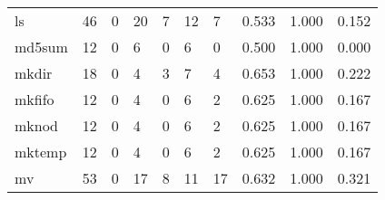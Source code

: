 \begin{longtable}{lp{1.3cm}p{1.3cm}p{1.3cm}p{1.3cm}p{1.3cm}p{1.3cm}p{1.3cm}p{1.3cm}p{1.3cm}}
ls        &                     46 &                                             0 &                                           20 &                                           7 &                                           12 &                                          7 &                                0.533 &                                  1.000 &                                0.152 \\
md5sum    &                     12 &                                             0 &                                            6 &                                           0 &                                            6 &                                          0 &                                0.500 &                                  1.000 &                                0.000 \\
mkdir     &                     18 &                                             0 &                                            4 &                                           3 &                                            7 &                                          4 &                                0.653 &                                  1.000 &                                0.222 \\
mkfifo    &                     12 &                                             0 &                                            4 &                                           0 &                                            6 &                                          2 &                                0.625 &                                  1.000 &                                0.167 \\
mknod     &                     12 &                                             0 &                                            4 &                                           0 &                                            6 &                                          2 &                                0.625 &                                  1.000 &                                0.167 \\
mktemp    &                     12 &                                             0 &                                            4 &                                           0 &                                            6 &                                          2 &                                0.625 &                                  1.000 &                                0.167 \\
mv        &                     53 &                                             0 &                                           17 &                                           8 &                                           11 &                                         17 &                                0.632 &                                  1.000 &                                0.321 \\

\end{longtable}
